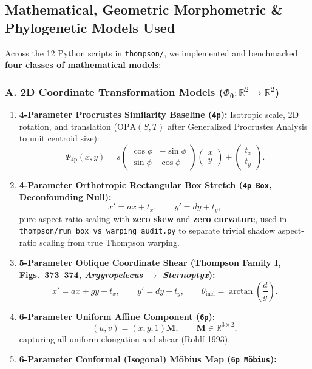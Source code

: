 \documentclass[10.5pt,a4paper]{article}
\newcommand{\code}[1]{{\footnotesize\nolinkurl{#1}}}
\begin{document}
\subsection{Mathematical, Geometric Morphometric \& Phylogenetic Models Used}

Across the 12 Python scripts in \code{thompson/}, we implemented and benchmarked \textbf{four classes of mathematical models}:

\subsubsection*{A. 2D Coordinate Transformation Models ($\Phi_{\bm{\theta}} : \mathbb{R}^2 \to \mathbb{R}^2$)}
\begin{enumerate}
  \setlength{\itemsep}{3pt}
  \item \textbf{4-Parameter Procrustes Similarity Baseline (\texttt{4p}):} Isotropic scale, 2D rotation, and translation ($\mathrm{OPA}(S, T)$ after Generalized Procrustes Analysis to unit centroid size):
  \[
    \Phi_{\mathrm{4p}}(x, y) = s \begin{pmatrix} \cos\phi & -\sin\phi \\ \sin\phi & \cos\phi \end{pmatrix} \begin{pmatrix} x \\ y \end{pmatrix} + \begin{pmatrix} t_x \\ t_y \end{pmatrix}.
  \]
  \item \textbf{4-Parameter Orthotropic Rectangular Box Stretch (\texttt{4p Box}, Deconfounding Null):}
  \[
    x' = a x + t_x, \qquad y' = d y + t_y,
  \]
  pure aspect-ratio scaling with \textbf{zero skew} and \textbf{zero curvature}, used in \code{thompson/run_box_vs_warping_audit.py} to separate trivial shadow aspect-ratio scaling from true Thompson warping.
  \item \textbf{5-Parameter Oblique Coordinate Shear (Thompson Family I, Figs.\ 373--374, \emph{Argyropelecus} $\to$ \emph{Sternoptyx}):}
  \[
    x' = a x + g y + t_x, \qquad y' = d y + t_y, \qquad \theta_{\mathrm{incl}} = \arctan\!\left(\frac{d}{g}\right).
  \]
  \item \textbf{6-Parameter Uniform Affine Component (\texttt{6p}):}
  \[
    (u, v) = (x, y, 1)\bm{M}, \qquad \bm{M} \in \mathbb{R}^{3 \times 2},
  \]
  capturing all uniform elongation and shear (Rohlf 1993).
  \item \textbf{6-Parameter Conformal (Isogonal) M\"obius Map (\texttt{6p M\"obius}):}

\end{enumerate}
\end{document}
